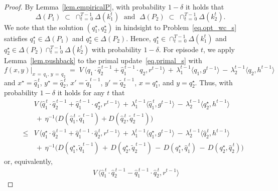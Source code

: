 \documentclass[12pt, final]{l4dc2023}
\begin{document}
\begin{proof}
	By Lemma~\ref{lem.empiricalP}, with probability $1-\delta$ it holds that 
	\[
	\Delta(P_1) \;\subset\; \cap_{t \,=\,0}^{T-1} \Delta(k_1^t) 
	\;\text{ and }\; 
	\Delta(P_2) \;\subset\; \cap_{t \,=\,0}^{T-1} \Delta(k_2^t).
	\]
	We note that the solution $(q_1^\star,q_2^\star)$ in hindsight to Problem~\eqref{eq.opt_wc_s} satisfies $q_1^\star\in\Delta(P_1)$ and $q_2^\star\in \Delta(P_2)$. Hence, $q_1^\star\in  \cap_{t \,=\,0}^{T-1} \Delta(k_1^t)  $ and $q_2^\star\in \Delta(P_2) \cap_{t \,=\,0}^{T-1} \Delta(k_2^t)$ with probability $1-\delta$. For episode $t$, we apply Lemma~\ref{lem.pushback} to the primal update~\eqref{eq.primal_s} with 
	\[
	f(x,y) \vert_{x\,=\,q_1,\, y\,=\,q_2} 
	\;=\;
	V\, \big\langle{q_1\cdot \hat q_2^{\,t-1}+\hat q_1^{\,t-1}\cdot q_2},{r^{t-1}}\big\rangle 
	\,+\,
	\lambda_1^{t-1} \langle{q_1},{g^{t-1}}\rangle 
	\,-\,\lambda_2^{t-1} \langle{q_2},{h^{t-1}}\rangle 
	\]
	and $x^\star = \hat q_1^{\,t}$, $y^\star= \hat q_2^{\,t}$, $x' = \tilde q_1^{\,t-1}$, $y'=\tilde q_2^{\,t-1}$, $x = q_1^\star$, and $y=q_2^\star$. Thus, with  probability $1-\delta$ it holds for any $t$ that
	\[
	\begin{array}{rcl}
	&& \!\!\!\! \!\!\!\! \!\! V\, \big\langle{\hat q_1^{\,t}\cdot \hat q_2^{\,t-1}+\hat q_1^{\,t-1}\cdot  q_2^\star},{r^{t-1}}\big\rangle 
	\,+\,
	\lambda_1^{t-1} \langle{\hat q_1^{\,t}},{g^{t-1}}\rangle 
	\,-\,\lambda_2^{t-1} \langle{ q_2^\star},{h^{t-1}}\rangle 
	\\[0.2cm]
	&& \!\!\!\! \!\!\!\! \!\! \,+\, \eta^{-1} \big(D(\hat q_1^{\,t},\tilde q_1^{\,t-1}) + D(\hat q_2^{\,t}, \tilde q_2^{\,t-1})\big)
	\\[0.2cm]
	&\leq  & V\, \big\langle{ q_1^\star\cdot \hat q_2^{\,t-1}+\hat q_1^{\,t-1}\cdot \hat q_2^{\,t}},{r^{t-1}}\big\rangle 
	\,+\,
	\lambda_1^{t-1} \langle{ q_1^\star},{g^{t-1}}\rangle 
	\,-\,\lambda_2^{t-1} \langle{ \hat q_2^{\,t}},{h^{t-1}}\rangle 
	\\[0.2cm]
	&& \,+\, \eta^{-1} \big(D( q_1^\star,\tilde q_1^{\,t-1}) \,+\, D( q_2^\star, \tilde q_2^{\,t-1}) \,-\, D( q_1^\star,\hat q_1^{\,t}) \,-\, D( q_2^\star, \hat q_2^{\,t}) \big)
	\end{array}
	\]
	or, equivalently,
	\begin{equation}\label{eq.pushback_V_s}
	\begin{array}{rcl}
	&& \!\!\!\! \!\!\!\! \!\! V\, \big\langle{\hat q_1^{\,t}\cdot \hat q_2^{\,t-1}- \hat q_1^{\,t-1}\cdot \hat q_2^{\,t}},{r^{t-1}}\big\rangle 

\end{array}
\end{equation}
\end{proof}
\end{document}
